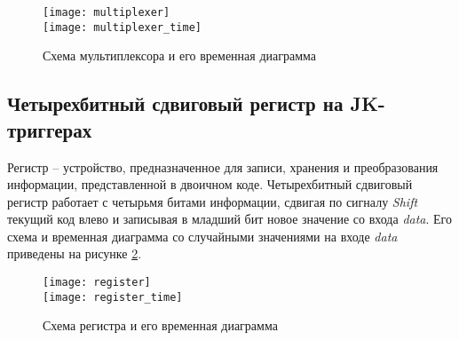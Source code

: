     \vspace{-2em}
    \begin{figure}[h!]
        \center
        \texttt{[image: multiplexer]} \vspace*{1em}\\
        \texttt{[image: multiplexer\_time]}
        \caption{Схема мультиплексора и его временная диаграмма}
        \label{pic_mux}
    \end{figure}
    
    \vspace{-1em}
    \subsection{Четырехбитный сдвиговый регистр на JK-триггерах}
    
    Регистр -- устройство, предназначенное для записи, хранения и
    преобразования информации, представленной в двоичном коде. Четырехбитный
    сдвиговый регистр работает с четырьмя битами информации, сдвигая по сигналу
    \emph{Shift} текущий код влево и записывая в младший бит новое значение со
    входа \emph{data}. Его схема и временная диаграмма со случайными значениями
    на входе \emph{data} приведены на рисунке \ref{pic_reg}.
    
    \begin{figure}[h!]
        \center
        \texttt{[image: register]} \vspace*{1em}\\
        \texttt{[image: register\_time]}
        \caption{Схема регистра и его временная диаграмма}
        \label{pic_reg}
    \end{figure}    

